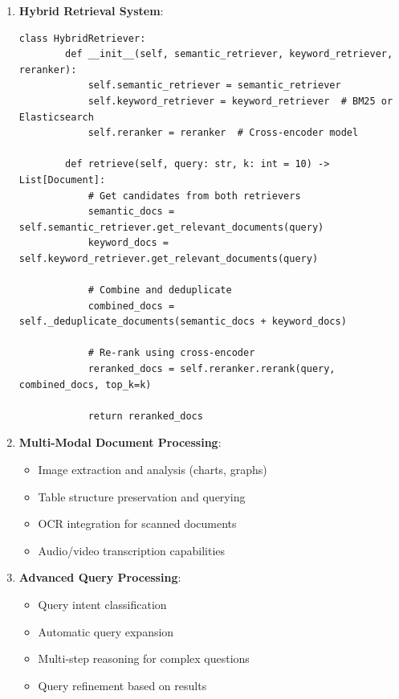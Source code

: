 \documentclass[12pt,a4paper]{article}
\begin{document}
\begin{enumerate}
    \item \textbf{Hybrid Retrieval System}:
    \begin{lstlisting}[caption=Proposed Hybrid Retrieval Architecture]
    class HybridRetriever:
        def __init__(self, semantic_retriever, keyword_retriever, reranker):
            self.semantic_retriever = semantic_retriever
            self.keyword_retriever = keyword_retriever  # BM25 or Elasticsearch
            self.reranker = reranker  # Cross-encoder model
        
        def retrieve(self, query: str, k: int = 10) -> List[Document]:
            # Get candidates from both retrievers
            semantic_docs = self.semantic_retriever.get_relevant_documents(query)
            keyword_docs = self.keyword_retriever.get_relevant_documents(query)
            
            # Combine and deduplicate
            combined_docs = self._deduplicate_documents(semantic_docs + keyword_docs)
            
            # Re-rank using cross-encoder
            reranked_docs = self.reranker.rerank(query, combined_docs, top_k=k)
            
            return reranked_docs
    \end{lstlisting}
    
    \item \textbf{Multi-Modal Document Processing}:
    \begin{itemize}
        \item Image extraction and analysis (charts, graphs)
        \item Table structure preservation and querying
        \item OCR integration for scanned documents
        \item Audio/video transcription capabilities
    \end{itemize}
    
    \item \textbf{Advanced Query Processing}:
    \begin{itemize}
        \item Query intent classification
        \item Automatic query expansion
        \item Multi-step reasoning for complex questions
        \item Query refinement based on results
    \end{itemize}
\end{enumerate}
\end{document}
